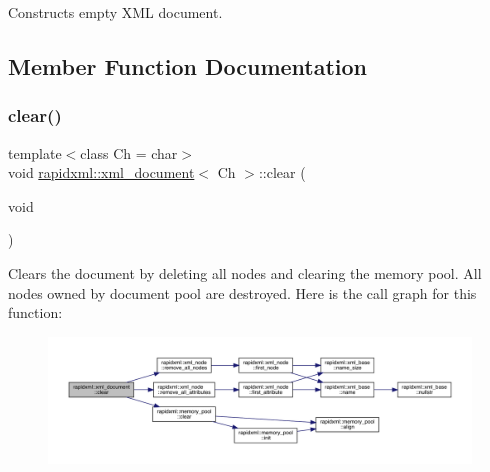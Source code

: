 Constructs empty X\+ML document. 



\subsection{Member Function Documentation}
\mbox{\label{classrapidxml_1_1xml__document_a826929ff54242532198701f19ff5f83f}} 
\subsubsection{\texorpdfstring{clear()}{clear()}}
{\footnotesize\ttfamily template$<$class Ch = char$>$ \\
void \mbox{\hyperlink{classrapidxml_1_1xml__document}{rapidxml\+::xml\+\_\+document}}$<$ Ch $>$\+::clear (\begin{DoxyParamCaption}\item[{void}]{ }\end{DoxyParamCaption})\hspace{0.3cm}{\ttfamily [inline]}}

Clears the document by deleting all nodes and clearing the memory pool. All nodes owned by document pool are destroyed. Here is the call graph for this function\+:\nopagebreak
\begin{figure}[H]
\begin{center}
\leavevmode
\includegraphics[width=350pt]{classrapidxml_1_1xml__document_a826929ff54242532198701f19ff5f83f_cgraph}
\end{center}
\end{figure}
\mbox{\label{classrapidxml_1_1xml__document_ae33040bcfa8e5a29dc6f6f130984a981}} 
